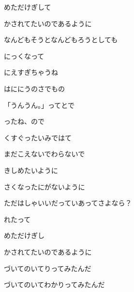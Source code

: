 \documentclass[a4paper,tate,twocolumn,12pt]{ltjtarticle}
\begin{document}
\begin{flushleft}
\begin{minipage}{\linewidth}
めただけぎして

かされてたいのであるように
\end{minipage}

\vspace{2em}

\noindent\begin{minipage}{\linewidth}
なんどもそうとなんどもろうとしても

にっくなって

にえすぎちゃうね

はににうのさでもの

「うんうん。」ってとで

ったね、ので

くすぐったいみではて
\end{minipage}

\vspace{2em}

\noindent\begin{minipage}{\linewidth}
まだこえないでわらないで

きしめたいように

さくなったにがないように

ただはしゃいいだっていあってさよなら？

れたって

めただけぎし

かされてたいのであるように
\end{minipage}

\vspace{2em}

\noindent\begin{minipage}{\linewidth}
づいてのいてりってみたんだ

づいてのいてわかりってみたんだ


\end{minipage}
\end{flushleft}
\end{document}
